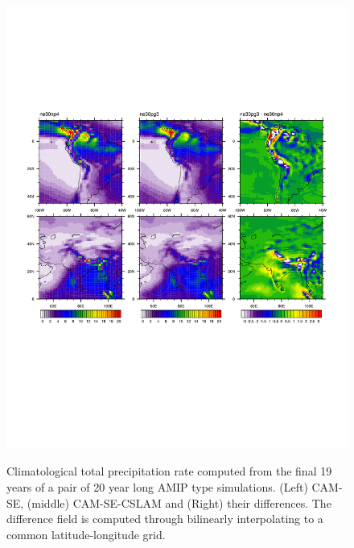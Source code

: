 \documentclass[twocol]{ametsoc}
\begin{document}
\begin{figure}[t]
\noindent\includegraphics[width=37pc,angle=0]{figs/AMIP_regional.pdf}\\
\caption{Climatological total precipitation rate computed from the final 19 years of a pair of 20 year long AMIP type simulations. (Left) CAM-SE, (middle) CAM-SE-CSLAM and (Right) their differences. The difference field is computed through bilinearly interpolating to a common latitude-longitude grid.}
\label{fig:AMIP-region}
\end{figure}
\end{document}
